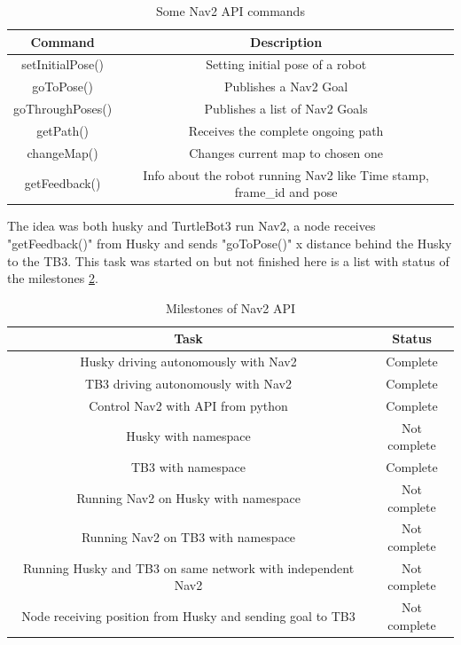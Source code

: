 \begin{table}[H]
    \centering
    \begin{tabular}{c|c}
        Command             & Description \\ \hline
        setInitialPose()    & Setting initial pose of a robot \\
        goToPose()          & Publishes a Nav2 Goal \\
        goThroughPoses()    & Publishes a list of Nav2 Goals \\
        getPath()           & Receives the complete ongoing path \\
        changeMap()         & Changes current map to chosen one \\
        getFeedback() & Info about the robot running Nav2 like Time stamp, frame\_id and pose\\
    \end{tabular}
    \caption{Some Nav2 API commands \cite{rosnavAPI}}
    \label{tab:Nav2API}
\end{table}

The idea was both husky and TurtleBot3 run Nav2, a node receives "getFeedback()" from Husky and sends "goToPose()" x distance behind the Husky to the TB3. This task was started on but not finished here is a list with status of the milestones \ref{tab:MilestonesNav2API}.
\begin{table}[H]
    \centering
    \begin{tabular}{c|c}
        Task                                                        & Status   \\ \hline
        Husky driving autonomously with Nav2                        & Complete \\
        TB3 driving autonomously with Nav2                          & Complete \\
        Control Nav2 with API from python                           & Complete \\
        Husky with namespace                                        & Not complete \\
        TB3 with namespace                                          & Complete \\
        Running Nav2 on Husky with namespace                        & Not complete \\
        Running Nav2 on TB3 with namespace                          & Not complete \\
        Running Husky and TB3 on same network with independent Nav2 & Not complete\\
        Node receiving position from Husky and sending goal to TB3  & Not complete \\
    \end{tabular}
    \caption{Milestones of Nav2 API}
    \label{tab:MilestonesNav2API}
\end{table}

